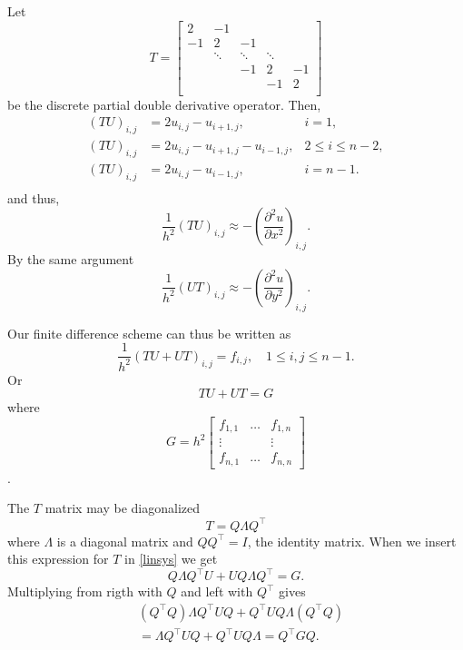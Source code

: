 \documentclass{article}
\begin{document}
Let 
\begin{equation}
       T = \begin{bmatrix}
               2 & -1 & & & \\
               -1 & 2 & -1 & & \\
               & \ddots & \ddots & \ddots &\\
               & & -1 & 2 & -1\\
               & & & -1 & 2 \\
       \end{bmatrix}
\end{equation}
be the discrete partial double derivative operator.
Then,
\begin{align*}
       (TU)_{i,j} &= 2u_{i,j} - u_{i+1,j}, &i=1,\\
       (TU)_{i,j} &= 2u_{i,j} - u_{i+1,j} - u_{i-1,j}, &2 \leq i \leq n-2,\\
       (TU)_{i,j} &= 2u_{i,j} - u_{i-1,j}, &i=n-1.\\
\end{align*}
and thus,
\[
\frac{1}{h^2}(TU)_{i,j} \approx - \left(\frac{\partial^2 u}{\partial x^2}\right)_{i,j}.
\]
By the same argument
\[
\frac{1}{h^2}(UT)_{i,j} \approx - \left(\frac{\partial^2 u}{\partial y^2}\right)_{i,j}.
\]

Our finite difference scheme can thus be written as
\[
\frac{1}{h^2}(TU + UT)_{i,j} = f_{i,j}, \quad 1\leq i,j \leq n-1.
\]
Or
\[
\label{linsys}
TU + UT = G
\]
where
\begin{equation}
G = h^2 \begin{bmatrix}
               f_{1,1} & \dots & f_{1,n} \\
               \vdots  &       & \vdots \\
               f_{n,1} & \dots & f_{n,n}
       \end{bmatrix}
\end{equation}.

The $T$ matrix may be diagonalized
\[
T = Q \Lambda Q^\top
\]
where $\Lambda$ is a diagonal matrix and $Q Q^\top=I$, the identity matrix.
When we insert this expression for $T$ in \eqref{linsys} we get
\[
Q \Lambda Q^\top U + U Q \Lambda Q^\top = G.
\]
Multiplying from rigth with $Q$ and left with $Q^\top$ gives
\begin{align*}
&(Q^\top Q) \Lambda Q^\top U Q + Q^\top U Q \Lambda (Q^\top Q)\\
&= \Lambda Q^\top U Q + Q^\top U Q \Lambda = Q^\top G Q.
\end{align*}
\end{document}
